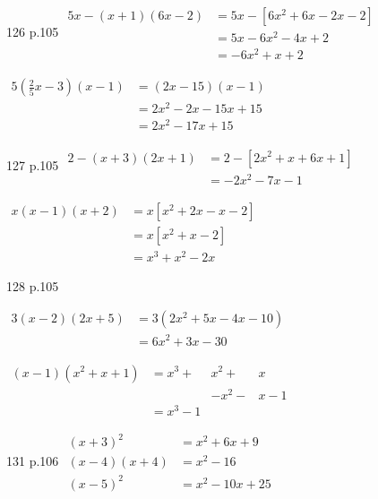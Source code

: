\documentclass[10pt,a4paper,openany,twoside]{book}
\begin{document}
\begin{bookexo}{126 p.105}
$\begin{aligned}
    5x-(x+1)(6x-2)
        &=5x-[6x^2+6x-2x-2]\\
        &=5x-6x^2-4x+2\\
        &=-6x^2+x+2
\end{aligned}$

$\begin{aligned}
    5(\frac{2}{5}x-3)(x-1)
        &= (2x-15)(x-1)\\
        &= 2x^2-2x-15x+15 \\
        &= 2x^2-17x+15
\end{aligned}$
\end{bookexo}

\begin{bookexo}{127 p.105}
$\begin{aligned}
    2-(x+3)(2x+1)
        &= 2-[2x^2+x+6x+1]\\
        &= -2x^2-7x-1
\end{aligned}$

$\begin{aligned}
    x(x-1)(x+2)
        &=  x[x^2+2x-x-2]\\
        &=  x[x^2+x-2]\\
        &=  x^3+x^2-2x
\end{aligned}$
\end{bookexo}

\begin{bookexo}{128 p.105}

$\begin{aligned}
    3(x-2)(2x+5)
        &=  3(2x^2+5x-4x-10)\\
        &=  6x^2+3x-30
\end{aligned}$

$\begin{aligned}
    (x-1)(x^2+x+1)
        &=  x^3+&x^2+&x\\
        &       &-x^2-&x-1\\
        &=  x^3-1
\end{aligned}$
\end{bookexo}

\begin{bookexo}{131 p.106}
$\begin{aligned}
    (x+3)^2&=x^2+6x+9 \\
    (x-4)(x+4)&=x^2-16 \\
    (x-5)^2&=x^2-10x+25
\end{aligned}$
\end{bookexo}
\end{document}
